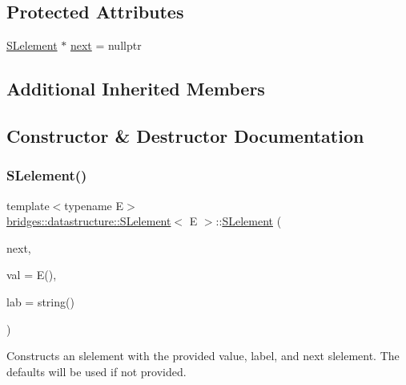\subsection*{Protected Attributes}
\begin{DoxyCompactItemize}
\item 
\hyperlink{classbridges_1_1datastructure_1_1_s_lelement}{S\+Lelement} $\ast$ \hyperlink{classbridges_1_1datastructure_1_1_s_lelement_afc016a593a4a5aba82021ee34edadbfc}{next} = nullptr
\end{DoxyCompactItemize}
\subsection*{Additional Inherited Members}


\subsection{Constructor \& Destructor Documentation}
\mbox{\label{classbridges_1_1datastructure_1_1_s_lelement_ac69e99f5b2b729a217160ee0517751aa}} 
\subsubsection{\texorpdfstring{S\+Lelement()}{SLelement()}\hspace{0.1cm}{\footnotesize\ttfamily [1/2]}}
{\footnotesize\ttfamily template$<$typename E$>$ \\
\hyperlink{classbridges_1_1datastructure_1_1_s_lelement}{bridges\+::datastructure\+::\+S\+Lelement}$<$ E $>$\+::\hyperlink{classbridges_1_1datastructure_1_1_s_lelement}{S\+Lelement} (\begin{DoxyParamCaption}\item[{\hyperlink{classbridges_1_1datastructure_1_1_s_lelement}{S\+Lelement}$<$ E $>$ $\ast$}]{next,  }\item[{const E \&}]{val = {\ttfamily E()},  }\item[{const string \&}]{lab = {\ttfamily string()} }\end{DoxyParamCaption})\hspace{0.3cm}{\ttfamily [inline]}}

Constructs an slelement with the provided value, label, and next slelement. The defaults will be used if not provided.


